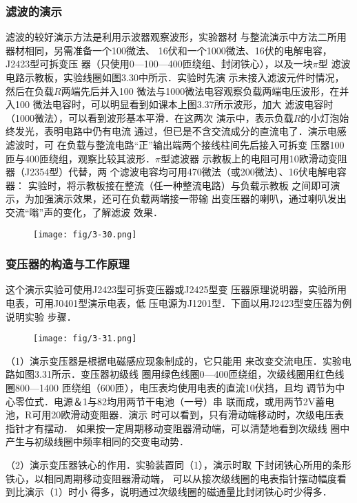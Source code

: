 \subsubsection{滤波的演示}
滤波的较好演示方法是利用示波器观察波形，实验器材
与整流演示中方法二所用器材相同，另需准备一个100微法、
16伏和一个1000微法、16伏的电解电容，J2423型可拆变压
器（只使用0—100—400匝绕组、封闭铁心），以及一块$\pi$型
滤波电路示教板，实验线圈如图3.30中所示．实验时先演
示未接入滤波元件时情况，然后在负载$R$两端先后并入100
微法与1000微法电容观察负载两端电压波形，在并入100
微法电容时，可以明显看到如课本上图3.37所示波形，加大
滤波电容时（1000微法），可以看到波形基本平滑．在这两次
演示中，表示负载$R$的小灯泡始终发光，表明电路中仍有电流
通过，但已是不含交流成分的直流电了．演示电感滤波时，可
在负载与整流电路“正”输出端两个接线柱间先后接入可拆变
压器100匝与400匝绕组，观察比较其波形．$\pi$型滤波器
示教板上的电阻可用10欧滑动变阻器（J2354型）代替，两
个滤波电容均可用470微法（或200微法）、16伏电解电容器：
实验时，将示教板接在整流（任一种整流电路）与负载示教板
之间即可演示，为加强演示效果，还可在负载两端接一带输
出变压器的喇叭，通过喇叭发出交流“嗡”声的变化，了解滤波
效果．

\begin{figure}[htp]
    \centering
\texttt{[image: fig/3-30.png]}
    \caption{}
\end{figure}

\subsubsection{变压器的构造与工作原理}
这个演示实验可使用J2423型可拆变压器或J2425型变
压器原理说明器，实验所用电表，可用J0401型演示电表，低
压电源为J1201型．下面以用J2423型变压器为例说明实验
步骤．
\begin{figure}[htp]
    \centering
\texttt{[image: fig/3-31.png]}
    \caption{}
\end{figure}

（1）演示变压器是根据电磁感应现象制成的，它只能用
来改变交流电压．实验电路如图3.31所示．变压器初级线
圈用绿色线圈0—400匝绕组，次级线圈用红色线圈800—1400
匝绕组（600匝），电压表均使用电表的直流10伏挡，且均
调节为中心零位式．电源＆1与82均用两节干电池（一号）串
联而成，或用两节2V蓄电池，R可用20欧滑动变阻器．演示
时可以看到，只有滑动端移动时，次级电压表指针才有摆动．
如果按一定周期移动变阻器滑动端，可以清楚地看到次级线
圈中产生与初级线圈中频率相同的交变电动势．

（2）演示变压器铁心的作用．实验装置同（1），演示时取
下封闭铁心所用的条形铁心，以相同周期移动变阻器滑动端，
可以从接次级线圈的电表指针摆动幅度看到比演示（1）时小
得多，说明通过次级线圈的磁通量比封闭铁心时少得多．

